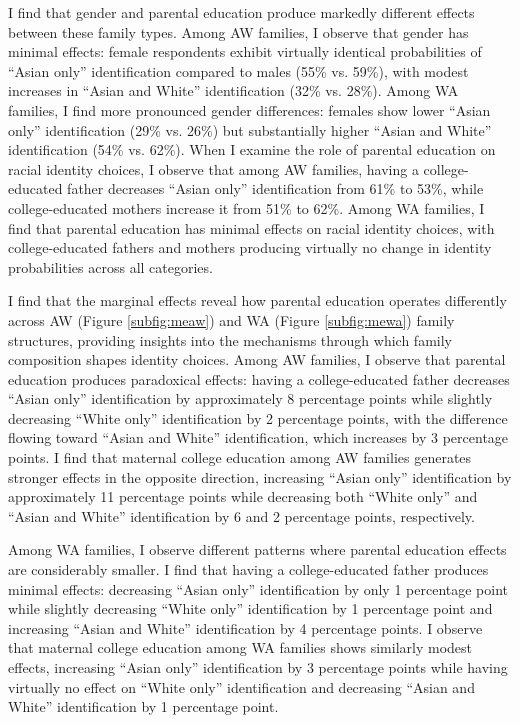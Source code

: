 I find that gender and parental education produce markedly different effects between these family types. Among AW families, I observe that gender has minimal effects: female respondents exhibit virtually identical probabilities of ``Asian only'' identification compared to males (55\% vs. 59\%), with modest increases in ``Asian and White'' identification (32\% vs. 28\%). Among WA families, I find more pronounced gender differences: females show lower ``Asian only'' identification (29\% vs. 26\%) but substantially higher ``Asian and White'' identification (54\% vs. 62\%). When I examine the role of parental education on racial identity choices, I observe that among AW families, having a college-educated father decreases ``Asian only'' identification from 61\% to 53\%, while college-educated mothers increase it from 51\% to 62\%. Among WA families, I find that parental education has minimal effects on racial identity choices, with college-educated fathers and mothers producing virtually no change in identity probabilities across all categories.

I find that the marginal effects reveal how parental education operates differently across AW (Figure \ref{subfig:meaw}) and WA (Figure \ref{subfig:mewa})  family structures, providing insights into the mechanisms through which family composition shapes identity choices. Among AW families, I observe that parental education produces paradoxical effects: having a college-educated father decreases ``Asian only'' identification by approximately 8 percentage points while slightly decreasing ``White only'' identification by 2 percentage points, with the difference flowing toward ``Asian and White'' identification, which increases by 3 percentage points. I find that maternal college education among AW families generates stronger effects in the opposite direction, increasing ``Asian only'' identification by approximately 11 percentage points while decreasing both ``White only'' and ``Asian and White'' identification by 6 and 2 percentage points, respectively.

Among WA families, I observe different patterns where parental education effects are considerably smaller. I find that having a college-educated father produces minimal effects: decreasing ``Asian only'' identification by only 1 percentage point while slightly decreasing ``White only'' identification by 1 percentage point and increasing ``Asian and White'' identification by 4 percentage points. I observe that maternal college education among WA families shows similarly modest effects, increasing ``Asian only'' identification by 3 percentage points while having virtually no effect on ``White only'' identification and decreasing ``Asian and White'' identification by 1 percentage point.

